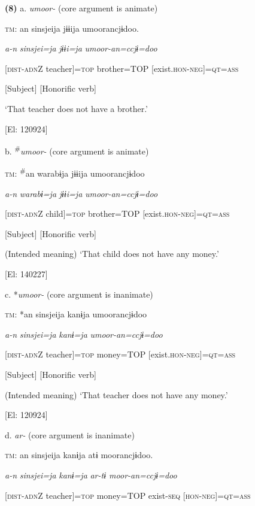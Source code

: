 \textbf{(8)}  a.  \textit{umoor-} (core argument is animate)

    \textsc{tm}:  an  sinsjeija  jɨɨija  umoorancjɨdoo.

      \textit{a-n}  \textit{sinsjei=ja}  \textit{jɨɨi=ja}  \textit{umoor{}-an=ccjɨ=doo}

      [\textsc{dist}-\textsc{adn}Z  teacher]=\textsc{top}  brother=TOP  [exist.\textsc{hon}-\textsc{neg}]=\textsc{qt}=\textsc{ass}

      [Subject]      [Honorific verb]

      ‘That teacher does not have a brother.’

      [El: 120924]

  b.  \textsuperscript{\#}\textit{umoor-} (core argument is animate)

    \textsc{tm}:  \textsuperscript{\#}an  warabɨja  jɨɨija  umoorancjɨdoo

      \textit{a-n}  \textit{warabɨ=ja}  \textit{jɨɨi=ja}  \textit{umoor{}-an=ccjɨ=doo}

      [\textsc{dist}-\textsc{adn}Z  child]=\textsc{top}  brother=TOP  [exist.\textsc{hon}-\textsc{neg}]=\textsc{qt}=\textsc{ass}

      [Subject]      [Honorific verb]

      (Intended meaning) ‘That child does not have any money.’

      [El: 140227]

  c.  *\textit{umoor-} (core argument is inanimate)

    \textsc{tm}:  *an  sinsjeija  kanɨja  umoorancjɨdoo

      \textit{a-n}  \textit{sinsjei=ja}  \textit{kanɨ=ja}  \textit{umoor{}-an=ccjɨ=doo}

      [\textsc{dist}-\textsc{adn}Z  teacher]=\textsc{top}  money=TOP  [exist.\textsc{hon}-\textsc{neg}]=\textsc{qt}=\textsc{ass}

      [Subject]      [Honorific verb]

      (Intended meaning) ‘That teacher does not have any money.’

      [El: 120924]

  d.  \textit{ar-} (core argument is inanimate)

    \textsc{tm}:  an  sinsjeija  kanɨja  atɨ  moorancjɨdoo.

      \textit{a-n}  \textit{sinsjei=ja}  \textit{kanɨ=ja}  \textit{ar{}-tɨ  moor-an=ccjɨ=doo}

      [\textsc{dist}-\textsc{adn}Z  teacher]=\textsc{top}  money=TOP  exist-\textsc{seq}  [\textsc{hon}-\textsc{neg}]=\textsc{qt}=\textsc{ass}

